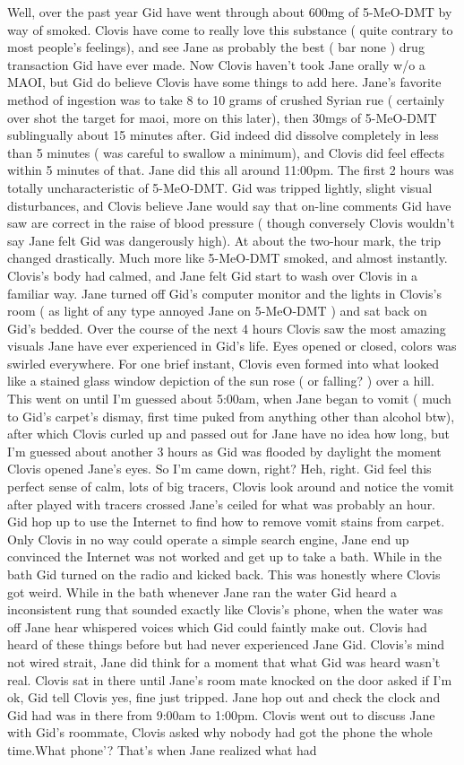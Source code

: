 \documentclass[12pt]{book}
\begin{document}
Well, over the past year Gid have went through about 600mg of 5-MeO-DMT by way of smoked. Clovis have come to really love this substance ( quite contrary to most people's feelings), and see Jane as probably the best ( bar none ) drug transaction Gid have ever made. Now Clovis haven't took Jane orally w/o a MAOI, but Gid do believe Clovis have some things to add here. Jane's favorite method of ingestion was to take 8 to 10 grams of crushed Syrian rue ( certainly over shot the target for maoi, more on this later), then 30mgs of 5-MeO-DMT sublingually about 15 minutes after. Gid indeed did dissolve completely in less than 5 minutes ( was careful to swallow a minimum), and Clovis did feel effects within 5 minutes of that. Jane did this all around 11:00pm. The first 2 hours was totally uncharacteristic of 5-MeO-DMT. Gid was tripped lightly, slight visual disturbances, and Clovis believe Jane would say that on-line comments Gid have saw are correct in the raise of blood pressure ( though conversely Clovis wouldn't say Jane felt Gid was dangerously high). At about the two-hour mark, the trip changed drastically. Much more like 5-MeO-DMT smoked, and almost instantly. Clovis's body had calmed, and Jane felt Gid start to wash over Clovis in a familiar way. Jane turned off Gid's computer monitor and the lights in Clovis's room ( as light of any type annoyed Jane on 5-MeO-DMT ) and sat back on Gid's bedded. Over the course of the next 4 hours Clovis saw the most amazing visuals Jane have ever experienced in Gid's life. Eyes opened or closed, colors was swirled everywhere. For one brief instant, Clovis even formed into what looked like a stained glass window depiction of the sun rose ( or falling? ) over a hill. This went on until I'm guessed about 5:00am, when Jane began to vomit ( much to Gid's carpet's dismay, first time puked from anything other than alcohol btw), after which Clovis curled up and passed out for Jane have no idea how long, but I'm guessed about another 3 hours as Gid was flooded by daylight the moment Clovis opened Jane's eyes. So I'm came down, right? Heh, right. Gid feel this perfect sense of calm, lots of big tracers, Clovis look around and notice the vomit after played with tracers crossed Jane's ceiled for what was probably an hour. Gid hop up to use the Internet to find how to remove vomit stains from carpet. Only Clovis in no way could operate a simple search engine, Jane end up convinced the Internet was not worked and get up to take a bath. While in the bath Gid turned on the radio and kicked back. This was honestly where Clovis got weird. While in the bath whenever Jane ran the water Gid heard a inconsistent rung that sounded exactly like Clovis's phone, when the water was off Jane hear whispered voices which Gid could faintly make out. Clovis had heard of these things before but had never experienced Jane Gid. Clovis's mind not wired strait, Jane did think for a moment that what Gid was heard wasn't real. Clovis sat in there until Jane's room mate knocked on the door asked if I'm ok, Gid tell Clovis yes, fine just tripped. Jane hop out and check the clock and Gid had was in there from 9:00am to 1:00pm. Clovis went out to discuss Jane with Gid's roommate, Clovis asked why nobody had got the phone the whole time.What phone'? That's when Jane realized what had 
\end{document}
